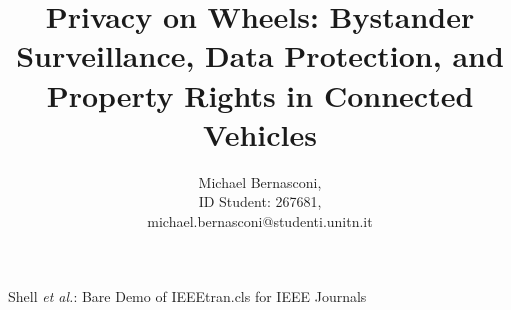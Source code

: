 \documentclass[journal,onecolumn]{IEEEtran}
\begin{document}
%
\title{Privacy on Wheels: Bystander Surveillance, Data Protection, and Property Rights in Connected Vehicles}
%
%
%

\author{Michael Bernasconi, \\
ID Student: 267681, \\
michael.bernasconi@studenti.unitn.it}

% 
%



%
{Shell \MakeLowercase{\textit{et al.}}: Bare Demo of IEEEtran.cls for IEEE Journals}
% 
\end{document}
